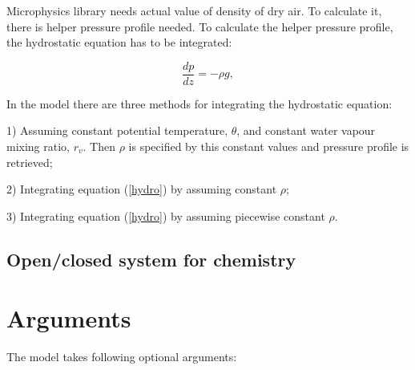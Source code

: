\documentclass[11pt]{article}
\begin{document}
Microphysics library needs actual value of density of dry air. To calculate it, there is helper pressure profile needed. To calculate the helper pressure profile, the hydrostatic equation has to be integrated:

\begin{equation}
	\frac{dp}{dz} = -\rho g,
	\label{hydro}
\end{equation}


In the model there are three methods for integrating the hydrostatic equation:

1) Assuming constant potential temperature, $\theta$, and constant water vapour mixing ratio, $r_v$. Then $\rho$ is specified by this constant values and pressure profile is retrieved;

2) Integrating equation (\ref{hydro}) by assuming constant $\rho$;

3) Integrating equation (\ref{hydro}) by assuming piecewise constant $\rho$.

\subsection{Open/closed system for chemistry}

\section{Arguments}

The model takes following optional arguments:
\end{document}
